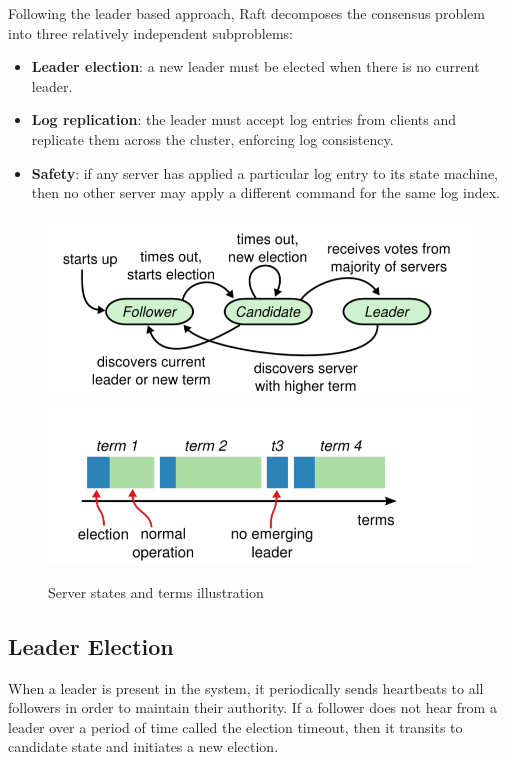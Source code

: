 \documentclass[11pt]{article}
\begin{document}
Following the leader based approach, Raft decomposes the consensus problem into three relatively independent subproblems:
\begin{itemize}
    \item \textbf{Leader election}: a new leader must be elected when there is no current leader.
    \item \textbf{Log replication}: the leader must accept log entries from clients and replicate them across the cluster, enforcing log consistency.
    \item \textbf{Safety}: if any server has applied a particular log entry to its state machine, then no other server may apply a different command for the same log index.
\end{itemize}

\begin{figure}[h]
  \centering
    \includegraphics[scale=0.4]{transitions.PNG}
    \includegraphics[scale=0.4]{term.PNG}
  \caption{Server states and terms illustration \cite{Raft}}
  \label{fig:speech_production}
\end{figure}


\subsection{Leader Election}

When a leader is present in the system, it periodically sends heartbeats to all followers in order to maintain their authority. If a follower does not hear from a leader over a period of time called the election timeout, then it transits to candidate state and initiates a new election.
\end{document}

